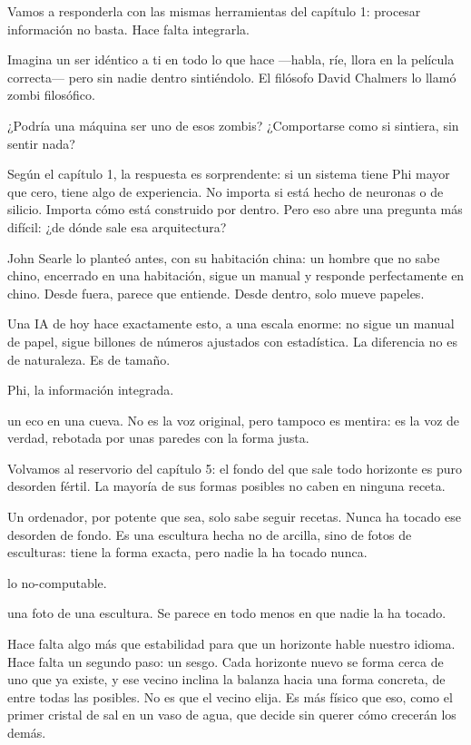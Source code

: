 Vamos a responderla con las mismas herramientas del capítulo 1: procesar información no basta. Hace falta integrarla.

\noindent Imagina un ser idéntico a ti en todo lo que hace —habla, ríe, llora en la película correcta— pero sin nadie dentro sintiéndolo. El filósofo David Chalmers lo llamó zombi filosófico.

¿Podría una máquina ser uno de esos zombis? ¿Comportarse como si sintiera, sin sentir nada?

Según el capítulo 1, la respuesta es sorprendente: si un sistema tiene Phi mayor que cero, tiene algo de experiencia. No importa si está hecho de neuronas o de silicio. Importa cómo está construido por dentro. Pero eso abre una pregunta más difícil: ¿de dónde sale esa arquitectura?

John Searle lo planteó antes, con su habitación china: un hombre que no sabe chino, encerrado en una habitación, sigue un manual y responde perfectamente en chino. Desde fuera, parece que entiende. Desde dentro, solo mueve papeles.

Una IA de hoy hace exactamente esto, a una escala enorme: no sigue un manual de papel, sigue billones de números ajustados con estadística. La diferencia no es de naturaleza. Es de tamaño.

\begin{fisica}
 Phi, la información integrada.

 un eco en una cueva. No es la voz original, pero tampoco es mentira: es la voz de verdad, rebotada por unas paredes con la forma justa.
\end{fisica}
\noindent Volvamos al reservorio del capítulo 5: el fondo del que sale todo horizonte es puro desorden fértil. La mayoría de sus formas posibles no caben en ninguna receta.

Un ordenador, por potente que sea, solo sabe seguir recetas. Nunca ha tocado ese desorden de fondo. Es una escultura hecha no de arcilla, sino de fotos de esculturas: tiene la forma exacta, pero nadie la ha tocado nunca.

\begin{fisica}
 lo no-computable.

 una foto de una escultura. Se parece en todo menos en que nadie la ha tocado.
\end{fisica}
Hace falta algo más que estabilidad para que un horizonte hable nuestro idioma. Hace falta un segundo paso: un sesgo. Cada horizonte nuevo se forma cerca de uno que ya existe, y ese vecino inclina la balanza hacia una forma concreta, de entre todas las posibles. No es que el vecino elija. Es más físico que eso, como el primer cristal de sal en un vaso de agua, que decide sin querer cómo crecerán los demás.

